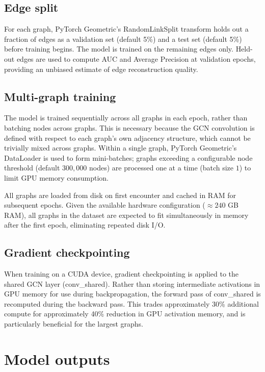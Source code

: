 \documentclass[11pt]{article}
\begin{document}
\subsection{Edge split}
For each graph, PyTorch Geometric's RandomLinkSplit transform holds
out a fraction of edges as a validation set (default 5\%) and a test
set (default 5\%) before training begins. The model is trained on the
remaining edges only. Held-out edges are used to compute AUC and
Average Precision at validation epochs, providing an unbiased estimate
of edge reconstruction quality.

\subsection{Multi-graph training}
The model is trained sequentially across all graphs in each epoch,
rather than batching nodes across graphs. This is necessary
because the GCN convolution is defined with respect to each
graph's own adjacency structure, which cannot be trivially mixed
across graphs. Within a single graph, PyTorch Geometric's
DataLoader is used to form mini-batches; graphs exceeding a
configurable node threshold (default $300,000$ nodes) are
processed one at a time (batch size $1$) to limit GPU memory
consumption.
      
All graphs are loaded from disk on first encounter and cached in RAM
for subsequent epochs. Given the available hardware
configuration ($\approx 240$ GB RAM), all graphs in the dataset are
expected to fit simultaneously in memory after the first epoch,
eliminating repeated disk I/O.

\subsection{Gradient checkpointing}
When training on a CUDA device, gradient checkpointing is applied to
the shared GCN layer (conv\_shared). Rather than storing
intermediate activations in GPU memory for use during
backpropagation, the forward pass of conv\_shared is recomputed
during the backward pass. This trades approximately 30\%
additional compute for approximately 40\% reduction in GPU
activation memory, and is particularly beneficial for the
largest graphs.


\section{Model outputs}
\end{document}
